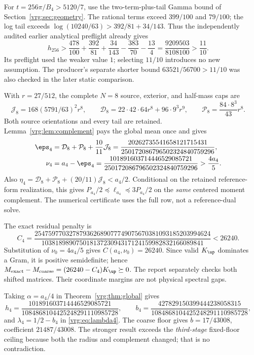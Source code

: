 \documentclass[11pt,a4paper]{article}
\numberwithin{equation}{section}
\theoremstyle{definition}\newtheorem{definition}[theorem]{Definition}
\theoremstyle{remark}\newtheorem{remark}[theorem]{Remark}
\begin{document}
For \(t=256\pi/B_4>5120/7\), use the two-term-plus-tail Gamma bound
of Section~\ref{vrg:sec:geometry}. The rational terms exceed \(399/100\) and \(79/100\);
the log tail exceeds
\(\log(10240/63)>392/81+34/143\). Thus the independently audited
earlier analytical preflight already gives
\[
h_{256}>
 \frac{478}{100}+\frac{392}{81}+\frac{34}{143}
 -\frac{383}{70}-\frac{13}{4}
 =\frac{9209503}{8108100}>\frac{11}{10}.
\]
Its preflight used the weaker value \(1\); selecting \(11/10\) introduces
no new assumption. The producer's separate shorter bound
\(63521/56700>11/10\) was also checked in the later static comparison.

With \(r=27/512\), the complete \(N=8\) source, exterior, and half-mass caps are
\[
\mathcal J_8=168(5791/63)^2r^8,\qquad
\mathcal D_8=22\cdot42\cdot64r^8+96\cdot9^3r^9,\qquad
\mathcal P_8=\frac{84\cdot8^3}{43}r^8.
\]
Both source orientations and every tail are retained.
Lemma~\ref{vrg:lem:complement} pays the global mean once and gives
\begin{align*}
\eps_4&=\mathcal D_8+\mathcal P_8+\frac{10}{11}\mathcal J_8
 =\frac{20262735541658121715431}{250172086796502324840759296},\\
\nu_4&=a_4-\eps_4
 =\frac{101891603714446529085721}{250172086796502324840759296}
 >\frac{4a_4}{5}.
\end{align*}
Also \(\eta_4=\mathcal D_8+\mathcal P_8+(20/11)\mathcal J_8<a_4/2\).
Conditional on the retained reference-form realization, this gives
\(P_{a_4}/2\preceq\ell_{a_4}\preceq3P_{a_4}/2\) on the \emph{same}
centered moment complement. The numerical certificate uses the full row,
not a reference-dual solve.

The exact residual penalty is
\[
C_4=\frac{254759770327879362689077749075670381093185203994624}
 {10381898907501813723094317124159982832166089841}<26240.
\]
Substitution of \(\nu_0=4a_4/5\) gives \(C(a_4,\nu_0)=26240\).
Since valid \(K_{\up}\) dominates a Gram, it is positive semidefinite;
hence \(M_{\rm exact}-M_{\rm coarse}=(26240-C_4)K_{\up}\succeq0\).
The report separately checks both shifted matrices. Their coordinate
margins are not physical spectral gaps.

Taking \(\alpha=a_4/4\) in Theorem~\ref{vrg:thm:global} gives
\[
h_4=\frac{101891603714446529085721}{1084868104425248291110985728},
\qquad
b_4=\frac{427829150399444238058315}{1084868104425248291110985728},
\]
and \(\lambda_4=1/2-b_4\) in \eqref{vrg:eq:lambda4}.
The coarse floor gives \(b=17/43008\), coefficient \(21487/43008\).
The stronger result exceeds the \emph{third-stage} fixed-floor ceiling
because both the radius and complement changed; that is no contradiction.
\end{document}
